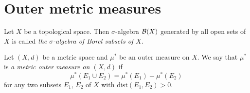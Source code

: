 \section{Outer metric measures}

\begin{definition}
    Let $X$ be a topological space. Then $\sigma$-algebra ${\mathcal B}(X)$ generated by all open sets of $X$ is called \textit{the $\sigma$-algebra of Borel subsets of $X$}.
\end{definition}

\begin{definition}
    Let $(X,d)$ be a metric space and $\mu^*$ be an outer measure on $X$. We say that $\mu^*$ is \textit{a metric outer measure on $(X,d)$} if
    $$\mu^*(E_1\cup E_2)=\mu^*(E_1)+\mu^*(E_2)$$
    for any two subsets $E_1$, $E_2$ of $X$ with $\mathrm{dist}(E_1,E_2) > 0$.
\end{definition}

